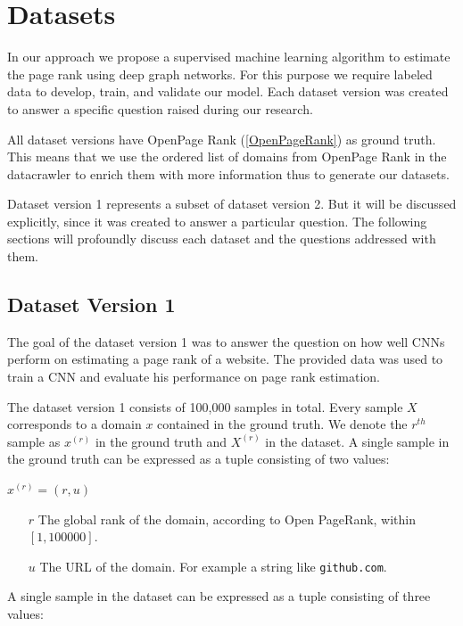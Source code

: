 
\section{Datasets}
\label{datasets}
In our approach we propose a supervised machine learning algorithm to estimate the page rank using deep graph networks. For this purpose we require labeled data to develop, train, and validate our model. Each dataset version was created to answer a specific question raised during our research.

All dataset versions have OpenPage Rank (\ref{OpenPageRank}) as ground truth. This means that we use the ordered list of domains from OpenPage Rank in the datacrawler to enrich them with more information thus to generate our datasets.

Dataset version 1 represents a subset of dataset version 2. But it will be discussed explicitly, since it was created to answer a particular question. The following sections will profoundly discuss each dataset and the questions addressed with them. 

\subsection{Dataset Version 1}
\label{DatasetVersion1}
The goal of the dataset version 1 was to answer the question on how well CNNs perform on estimating a page rank of a website. The provided data was used to train a CNN and evaluate his performance on page rank estimation.

The dataset version 1 consists of 100,000 samples in total. Every sample $X$ corresponds to a domain $x$ contained in the ground truth. We denote the $r^{th}$ sample as $x^{(r)}$ in the ground truth and $X^{(r)}$ in the dataset. 
A single sample in the ground truth can be expressed as a tuple consisting of two values:

\begin{center}
	$x^{(r)} = (r, u)$
	\begin{itemize}
		\item[$r$] The global rank of the domain, according to Open PageRank, within $[1, 100000]$. 
		\item[$u$] The URL of the domain. For example a string like \texttt{github.com}.
	\end{itemize}
\end{center}

A single sample in the dataset can be expressed as a tuple consisting of three values:

